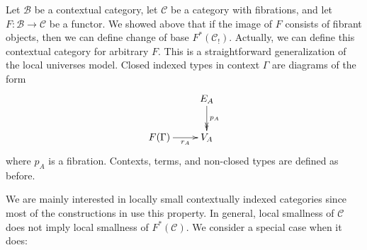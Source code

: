 \documentclass[reqno]{amsart}
\theoremstyle{definition}
\theoremstyle{remark}
\newcommand{\scat}[1]{\mathcal{#1}}
\numberwithin{figure}{section}
\begin{document}
Let $\scat{B}$ be a contextual category, let $\scat{C}$ be a category with fibrations, and let $F : \scat{B} \to \scat{C}$ be a functor.
We showed above that if the image of $F$ consists of fibrant objects, then we can define change of base $F^*(\scat{C}_!)$.
Actually, we can define this contextual category for arbitrary $F$.
This is a straightforward generalization of the local universes model.
Closed indexed types in context $\Gamma$ are diagrams of the form
\[ \xymatrix{                           & E_A \ar@{->>}[d]^{p_A} \\
              F(\Gamma) \ar[r]_-{r_A}   & V_A
            } \]
where $p_A$ is a fibration.
Contexts, terms, and non-closed types are defined as before.

We are mainly interested in locally small contextually indexed categories since most of the constructions in \cite{indexed-tt} use this property.
In general, local smallness of $\scat{C}$ does not imply local smallness of $F^*(\scat{C})$.
We consider a special case when it does:
\end{document}
